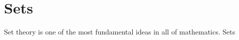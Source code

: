 \setcounter{chapter}{-1}
\chapter{Sets}
\noindent

Set theory is one of the most fundamental ideas in all of mathematics. Sets 
